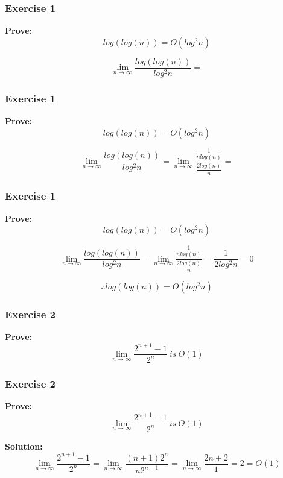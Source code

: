 \documentclass{beamer}
\begin{document}
\begin{frame}[noframenumbering]
\frametitle{Exercise 1}
\textbf{Prove:} $$log(log(n))=O(log^{2}n)$$

 
  $$\lim_{n \to \infty} \frac{log(log(n))}{log^{2}n}= $$
 
\end{frame}

\begin{frame}[noframenumbering]
\frametitle{Exercise 1}
\textbf{Prove:} $$log(log(n))=O(log^{2}n)$$

 
  $$\lim_{n \to \infty} \frac{log(log(n))}{log^{2}n}=\lim_{n \to \infty} \frac{\frac{1}{nlog(n)}}{\frac{2log(n)}{n}}=  $$

\end{frame}

 \begin{frame}[noframenumbering]
 \frametitle{Exercise 1}
\textbf{Prove:} $$log(log(n))=O(log^{2}n)$$

 
  $$\lim_{n \to \infty} \frac{log(log(n))}{log^{2}n}=\lim_{n \to \infty} \frac{\frac{1}{nlog(n)}}{\frac{2log(n)}{n}} = \frac{1}{2log^{2}n}=0$$
 

$$\therefore log(log(n))=O(log^{2}n)$$
 
\end{frame}

\begin{frame} 
 \frametitle{Exercise 2}
\textbf{Prove:}  $$\lim_{n \to \infty}    \frac{2^{n+1} - 1}{2^{n}}  \ is \  O(1)$$   
\end{frame}

\begin{frame}[noframenumbering]
 \frametitle{Exercise 2}
\textbf{Prove:}  $$\lim_{n \to \infty}    \frac{2^{n+1} - 1}{2^{n}}  \ is \  O(1)$$  

\textbf{Solution:}  $$\lim_{n \to \infty}    \frac{2^{n+1} - 1}{2^{n}} =\lim_{n \to \infty}   \frac{(n+1)2^{n}}{n2^{n-1}}=\lim_{n \to \infty}   \frac{2n+2}{1}=2 = O(1) $$\end{frame}
\end{document}
